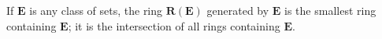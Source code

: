 If $\mathbf{E}$ is any class of sets, the ring $\mathbf{R}(\mathbf{E})$ generated by $\mathbf{E}$ is the smallest ring containing $\mathbf{E}$; it is the intersection of all rings containing $\mathbf{E}$.
